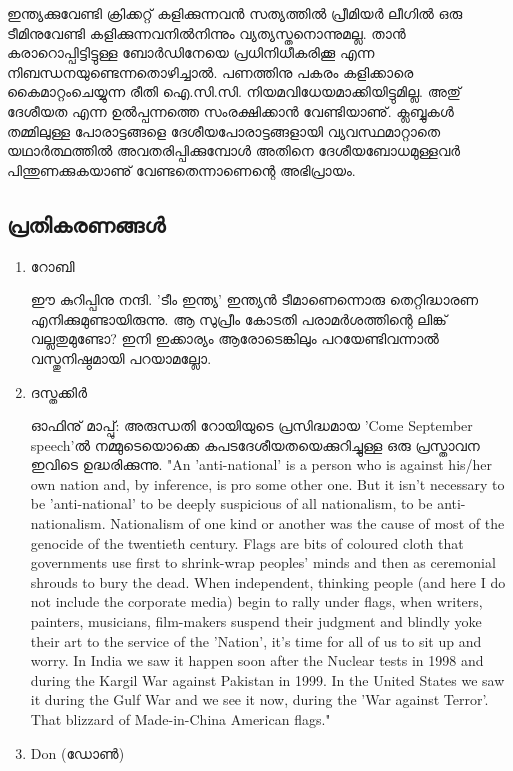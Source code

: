 ഇന്ത്യക്കുവേണ്ടി ക്രിക്കറ്റ് കളിക്കുന്നവന്‍ സത്യത്തില്‍ പ്രീമിയര്‍ ലീഗില്‍ ഒരു ടീമിനുവേണ്ടി കളിക്കുന്നവനില്‍നിന്നും 
വ്യത്യസ്തനൊന്നുമല്ല. താന്‍ കരാറൊപ്പിട്ടിട്ടുള്ള ബോര്‍ഡിനേയെ പ്രധിനിധീകരിക്കൂ എന്ന നിബന്ധനയുണ്ടെന്നതൊഴിച്ചാല്‍. 
പണത്തിനു പകരം കളിക്കാരെ കൈമാറ്റംചെയ്യുന്ന രീതി ഐ.സി.സി. നിയമവിധേയമാക്കിയിട്ടുമില്ല. 
അതു് ദേശീയത എന്ന ഉല്‍പ്പന്നത്തെ സംരക്ഷിക്കാന്‍ വേണ്ടിയാണു്. ക്ലബ്ബുകള്‍ തമ്മിലുള്ള പോരാട്ടങ്ങളെ 
ദേശീയപോരാട്ടങ്ങളായി വ്യവസ്ഥമാറ്റാതെ യഥാര്‍ത്ഥത്തില്‍ അവതരിപ്പിക്കുമ്പോള്‍ അതിനെ ദേശീയബോധമുള്ളവര്‍ 
പിന്തുണക്കുകയാണു് വേണ്ടതെന്നാണെന്റെ അഭിപ്രായം.

\subsection*{പ്രതികരണങ്ങള്‍}
\begin{enumerate}
 \item{റോബി}

ഈ കുറിപ്പിനു നന്ദി. 'ടീം ഇന്ത്യ' ഇന്ത്യന്‍ ടീമാണെന്നൊരു തെറ്റിദ്ധാരണ എനിക്കുമുണ്ടായിരുന്നു. 
ആ സുപ്രീം കോടതി പരാമര്‍ശത്തിന്റെ ലിങ്ക് വല്ലതുമുണ്ടോ? ഇനി ഇക്കാര്യം ആരോടെങ്കിലും 
പറയേണ്ടിവന്നാല്‍ വസ്തുനിഷ്ഠമായി പറയാമല്ലോ.

 \item{ദസ്തക്കിര്‍}

ഓഫിനു് മാപ്പു്: അരുന്ധതി റോയിയുടെ പ്രസിദ്ധമായ 'Come September speech'ല്‍ നമ്മുടെയൊക്കെ കപടദേശീയതയെക്കുറിച്ചുള്ള 
ഒരു പ്രസ്താവന ഇവിടെ ഉദ്ധരിക്കുന്നു. "An 'anti-national' is a person who is against his/her 
own nation and, by inference, is pro some other one. But it isn't necessary to be 'anti-national' 
to be deeply suspicious of all nationalism, to be anti-nationalism. Nationalism of one kind or 
another was the cause of most of the genocide of the twentieth century. 
Flags are bits of coloured cloth that governments use first to shrink-wrap peoples' 
minds and then as ceremonial shrouds to bury the dead. When independent, thinking people 
(and here I do not include the corporate media) begin to rally under flags, when writers, 
painters, musicians, film-makers suspend their judgment and blindly yoke their art to the service of the 'Nation', 
it's time for all of us to sit up and worry. In India we saw it happen soon after the Nuclear tests in 
1998 and during the Kargil War against Pakistan in 1999. In the United States we saw it during 
the Gulf War and we see it now, during the 'War against Terror'. 
That blizzard of Made-in-China American flags."

 \item{Don (ഡോണ്‍)}


\end{enumerate}
